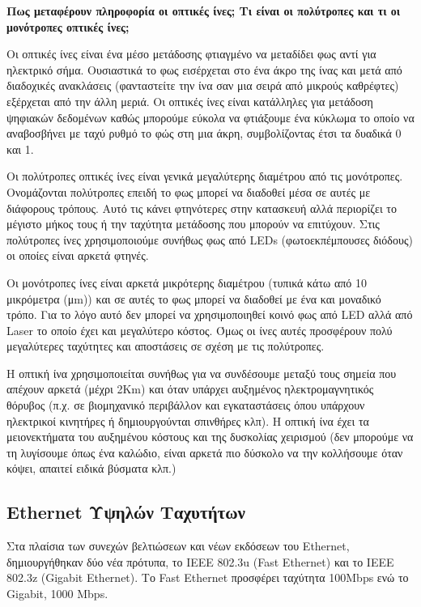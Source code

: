 \begin{inthebox}
\textbf{Πως μεταφέρουν πληροφορία οι οπτικές ίνες; Τι είναι οι πολύτροπες και τι οι μονότροπες οπτικές ίνες;}

Οι οπτικές ίνες είναι ένα μέσο μετάδοσης φτιαγμένο να μεταδίδει φως αντί για ηλεκτρικό σήμα. Ουσιαστικά το φως εισέρχεται στο ένα άκρο της ίνας και μετά από διαδοχικές ανακλάσεις (φανταστείτε την ίνα σαν μια σειρά από μικρούς καθρέφτες) εξέρχεται από την άλλη μεριά. Οι οπτικές ίνες είναι κατάλληλες για μετάδοση ψηφιακών δεδομένων καθώς μπορούμε εύκολα να φτιάξουμε ένα κύκλωμα το οποίο να αναβοσβήνει με ταχύ ρυθμό το φώς στη μια άκρη, συμβολίζοντας έτσι τα δυαδικά 0 και 1.

Οι πολύτροπες οπτικές ίνες είναι γενικά μεγαλύτερης διαμέτρου από τις μονότροπες. Ονομάζονται πολύτροπες επειδή το φως μπορεί να διαδοθεί μέσα σε αυτές με διάφορους τρόπους. Αυτό τις κάνει φτηνότερες στην κατασκευή αλλά περιορίζει το μέγιστο μήκος τους ή την ταχύτητα μετάδοσης που μπορούν να επιτύχουν. Στις πολύτροπες ίνες χρησιμοποιούμε συνήθως φως από LEDs (φωτοεκπέμπουσες διόδους) οι οποίες είναι αρκετά φτηνές. 

Οι μονότροπες ίνες είναι αρκετά μικρότερης διαμέτρου (τυπικά κάτω από 10 μικρόμετρα (μm)) και σε αυτές το φως μπορεί να διαδοθεί με ένα και μοναδικό τρόπο. Για το λόγο αυτό δεν μπορεί να χρησιμοποιηθεί κοινό φως από LED αλλά από Laser το οποίο έχει και μεγαλύτερο κόστος. Όμως οι ίνες αυτές προσφέρουν πολύ μεγαλύτερες ταχύτητες και αποστάσεις σε σχέση με τις πολύτροπες. \\
\end{inthebox}

Η οπτική ίνα χρησιμοποιείται συνήθως για να συνδέσουμε μεταξύ τους σημεία που απέχουν αρκετά (μέχρι 2Km) και όταν υπάρχει αυξημένος ηλεκτρομαγνητικός θόρυβος (π.χ. σε βιομηχανικό περιβάλλον και εγκαταστάσεις όπου υπάρχουν ηλεκτρικοί κινητήρες ή δημιουργούνται σπινθήρες κλπ). Η οπτική ίνα έχει τα μειονεκτήματα του αυξημένου κόστους και της δυσκολίας χειρισμού (δεν μπορούμε να τη λυγίσουμε όπως ένα καλώδιο, είναι αρκετά πιο δύσκολο να την κολλήσουμε όταν κόψει, απαιτεί ειδικά βύσματα κλπ.)

\subsection*{Ethernet Υψηλών Ταχυτήτων}

Στα πλαίσια των συνεχών βελτιώσεων και νέων εκδόσεων του Ethernet, δημιουργήθηκαν δύο νέα πρότυπα, το IEEE 802.3u (Fast Ethernet) και το IEEE 802.3z (Gigabit Ethernet). Το Fast Ethernet προσφέρει ταχύτητα 100Mbps ενώ το Gigabit, 1000 Mbps.

